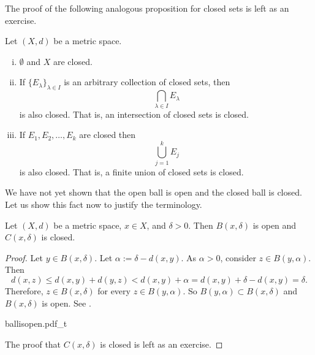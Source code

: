 The proof of the following analogous proposition for closed sets
is left as an exercise.

\begin{prop} \label{prop:topology:closed}
Let $(X,d)$ be a metric space.
\begin{enumerate}[(i)]
\item \label{topology:closedi} $\emptyset$ and $X$ are closed.
\item \label{topology:closedii} If $\{ E_\lambda \}_{\lambda \in I}$ is
an arbitrary collection of closed sets, then
\begin{equation*}
\bigcap_{\lambda \in I} E_\lambda
\end{equation*}
is also closed.  That is, an intersection of closed sets is closed.
\item \label{topology:closediii} If $E_1, E_2, \ldots, E_k$ are closed then
\begin{equation*}
\bigcup_{j=1}^k E_j
\end{equation*}
is also closed.  That is, a finite union of closed sets is closed.
\end{enumerate}
\end{prop}

We have not yet shown that the open ball is open and the closed ball is
closed.  Let us show this fact now to justify the terminology.

\begin{prop} \label{prop:topology:ballsopenclosed}
Let $(X,d)$ be a metric space, $x \in X$, and $\delta > 0$.  Then
$B(x,\delta)$ is open and 
$C(x,\delta)$ is closed.
\end{prop}

\begin{proof}
Let $y \in B(x,\delta)$.  Let $\alpha := \delta-d(x,y)$.  As $\alpha
> 0$, consider $z \in B(y,\alpha)$.  Then
\begin{equation*}
d(x,z) \leq d(x,y) + d(y,z) < d(x,y) + \alpha = d(x,y) + \delta-d(x,y) =
\delta .
\end{equation*}
Therefore, $z \in B(x,\delta)$ for every $z \in B(y,\alpha)$.  So $B(y,\alpha) \subset B(x,\delta)$ and
$B(x,\delta)$ is open.  See .

\begin{myfigureht}
{ballisopen.pdf_t}
\caption{Proof that $B(x,\delta)$ is open: $B(y,\alpha) \subset
B(x,\delta)$ with the triangle inequality illustrated.\label{fig:ballisopen}}
\end{myfigureht}

The proof that $C(x,\delta)$ is closed is left as an exercise.
\end{proof}


